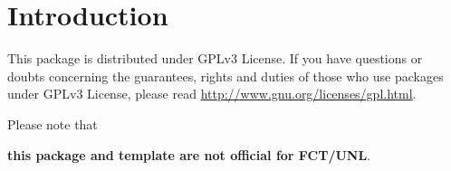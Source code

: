 % 
%  
%
\chapter{Introduction}
\label{cha:introduction}

This package is distributed under GPLv3 License. If you have questions or doubts concerning the guarantees, rights and duties of those who use packages under GPLv3 License, please read \url{http://www.gnu.org/licenses/gpl.html}.

Please note that 
\begin{center}
	\textbf{\large this package and template are not official for FCT/UNL}.
\end{center}
